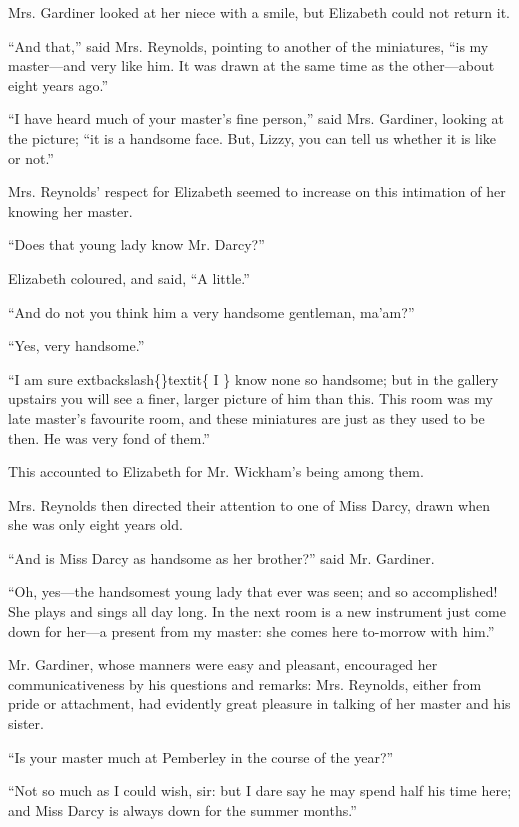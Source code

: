 \documentclass[10pt]{book}
\begin{document}
   Mrs. Gardiner looked at her niece with a smile, but Elizabeth could not
return it.
  

   “And that,” said Mrs. Reynolds, pointing to another of the miniatures,
“is my master—and very like him. It was drawn at the same time as the
other—about eight years ago.”
  

   “I have heard much of your master’s fine person,” said Mrs. Gardiner,
looking at the picture; “it is a handsome face. But, Lizzy, you can tell
us whether it is like or not.”
  

   Mrs. Reynolds’ respect for Elizabeth seemed to increase on this
intimation of her knowing her master.
  

   “Does that young lady know Mr. Darcy?”
  

   Elizabeth coloured, and said, “A little.”
  

   “And do not you think him a very handsome gentleman, ma’am?”
  

   “Yes, very handsome.”
  

   “I am sure
   	extbackslash\{\}textit\{
    I
   \}
   know none so handsome; but in the gallery upstairs you
will see a finer, larger picture of him than this. This room was my late
master’s favourite room, and these miniatures are just as they used to
be then. He was very fond of them.”
  

   This accounted to Elizabeth for Mr. Wickham’s being among them.
  

   Mrs. Reynolds then directed their attention to one of Miss Darcy, drawn
when she was only eight years old.
  

   “And is Miss Darcy as handsome as her brother?” said Mr. Gardiner.
  

   “Oh, yes—the handsomest young lady that ever was seen; and so
accomplished! She plays and sings all day long. In the next room is a
new instrument just come down for her—a present from my master: she
comes here to-morrow with him.”
  

   Mr. Gardiner, whose manners were easy and pleasant,
   encouraged her
communicativeness by his questions and remarks: Mrs. Reynolds, either
from pride or attachment, had evidently great pleasure in talking of her
master and his sister.
  

   “Is your master much at Pemberley in the course of the year?”
  

   “Not so much as I could wish, sir: but I dare say he may spend half his
time here; and Miss Darcy is always down for the summer months.”
  
\end{document}
